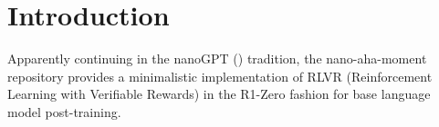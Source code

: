 \documentclass{article} %
\theoremstyle{definition}
\begin{document}
\section{Introduction}

Apparently continuing in the nanoGPT (\cite{Karpathy-2022}) tradition,
the nano-aha-moment repository provides a minimalistic implementation of RLVR (Reinforcement Learning with Verifiable Rewards) in the R1-Zero fashion
for base language model post-training.





\end{document}
